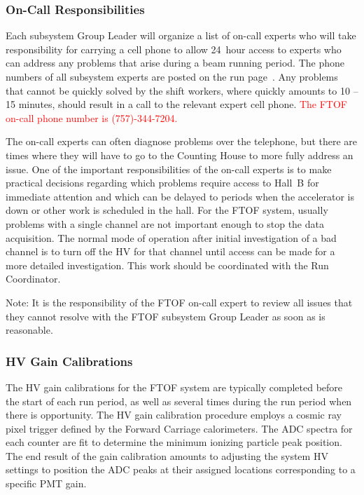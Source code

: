 \documentclass[12pt]{article}
\begin{document}
\subsubsection{On-Call Responsibilities}
\label{oncall}

Each subsystem Group Leader will organize a list of on-call experts who will take 
responsibility for carrying a cell phone to allow 24~hour access to experts who can 
address any problems that arise during a beam running period. The phone numbers of 
all subsystem experts are posted on the run page~\cite{run-page}. Any problems that 
cannot be quickly solved by the shift workers, where quickly amounts to 10 -- 15
minutes, should result in a call to the relevant expert cell phone. \textcolor{red}{The 
FTOF on-call phone number is (757)-344-7204.} 

The on-call experts can often diagnose problems over the telephone, but there are times 
where they will have to go to the Counting House to more fully address an issue. One of 
the important responsibilities of the on-call experts is to make practical decisions 
regarding which problems require access to Hall~B for immediate attention and which can 
be delayed to periods when the accelerator is down or other work is scheduled in the 
hall. For the FTOF system, usually problems with a single channel are not important 
enough to stop the data acquisition. The normal mode of operation after initial 
investigation of a bad channel is to turn off the HV for that channel until access can 
be made for a more detailed investigation. This work should be coordinated with the Run 
Coordinator.

Note: It is the responsibility of the FTOF on-call expert to review all issues that 
they cannot resolve with the FTOF subsystem Group Leader as soon as is reasonable.

\subsubsection{HV Gain Calibrations}
\label{gain-calib}

The HV gain calibrations for the FTOF system are typically completed before the start 
of each run period, as well as several times during the run period when there is 
opportunity. The HV gain calibration procedure employs a cosmic ray pixel trigger 
defined by the Forward Carriage calorimeters. The ADC spectra for each counter are fit 
to determine the minimum ionizing particle peak position. The end result of the gain 
calibration amounts to adjusting the system HV settings to position the ADC peaks at 
their assigned locations corresponding to a specific PMT gain.
\end{document}
